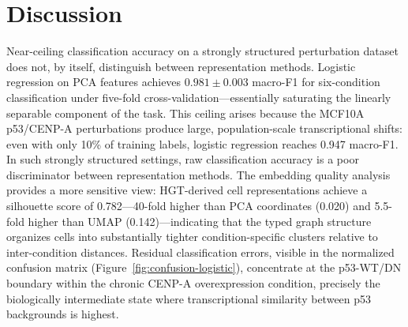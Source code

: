 \section{Discussion}

Near-ceiling classification accuracy on a strongly structured perturbation dataset
does not, by itself, distinguish between representation methods.
Logistic regression on PCA features achieves $0.981 \pm 0.003$ macro-F1 for
six-condition classification under five-fold cross-validation---essentially
saturating the linearly separable component of the task.
This ceiling arises because the MCF10A p53/CENP-A perturbations produce large,
population-scale transcriptional shifts: even with only 10\% of training labels,
logistic regression reaches 0.947 macro-F1.
In such strongly structured settings, raw classification accuracy is a poor
discriminator between representation methods.
The embedding quality analysis provides a more sensitive view: HGT-derived cell
representations achieve a silhouette score of 0.782---40-fold higher than PCA
coordinates (0.020) and 5.5-fold higher than UMAP (0.142)---indicating that the
typed graph structure organizes cells into substantially tighter condition-specific
clusters relative to inter-condition distances.
Residual classification errors, visible in the normalized confusion matrix
(Figure~\ref{fig:confusion-logistic}), concentrate at the p53-WT/DN boundary
within the chronic CENP-A overexpression condition, precisely the biologically
intermediate state where transcriptional similarity between p53 backgrounds is
highest.

